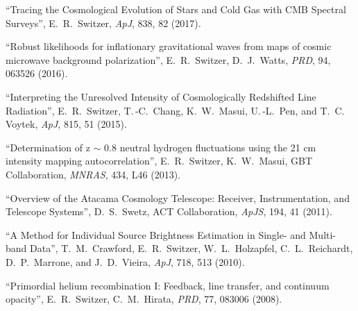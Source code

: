 \item ``Tracing the Cosmological Evolution of Stars and Cold Gas with CMB Spectral Surveys'', E.\, R.\, Switzer, {\it ApJ}, 838, 82 (2017).
\item ``Robust likelihoods for inflationary gravitational waves from maps of cosmic microwave background polarization'', E.\, R.\, Switzer, D.\, J.\, Watts, {\it PRD}, 94, 063526 (2016).
\item ``Interpreting the Unresolved Intensity of Cosmologically Redshifted Line Radiation'', E.\, R.\, Switzer, T.\,-C.\, Chang, K.\, W.\, Masui, U.\,-L.\, Pen, and T.\, C.\, Voytek, {\it ApJ}, 815, 51 (2015).
\item ``Determination of z $\sim$ 0.8 neutral hydrogen fluctuations using the 21 cm intensity mapping autocorrelation'', E.\, R.\, Switzer, K.\, W.\, Masui, GBT Collaboration, {\it MNRAS}, 434, L46 (2013).
\item ``Overview of the Atacama Cosmology Telescope: Receiver, Instrumentation, and Telescope Systems'', D.\, S.\, Swetz, ACT Collaboration, {\it ApJS}, 194, 41 (2011).
\item ``A Method for Individual Source Brightness Estimation in Single- and Multi-band Data'', T.\, M.\, Crawford, E.\, R.\, Switzer, W.\, L.\, Holzapfel, C.\, L.\, Reichardt, D.\, P.\, Marrone, and J.\, D.\, Vieira, {\it ApJ}, 718, 513 (2010).
\item ``Primordial helium recombination I: Feedback, line transfer, and continuum opacity'', E.\, R.\, Switzer, C.\, M.\, Hirata, {\it PRD}, 77, 083006 (2008).
